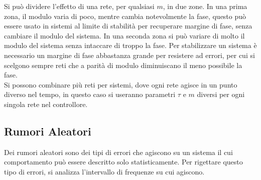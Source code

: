 \documentclass{article}
\numberwithin{equation}{subsection}
\begin{document}
Si può dividere l'effetto di una rete, per qualsiasi $m$, in due zone. In una prima zona, il modulo varia di poco, mentre cambia notevolmente la fase, questo può essere 
usato in sistemi al limite di stabilità per recuperare margine di fase, senza cambiare il modulo del sistema. In una seconda zona si può variare di molto il modulo del 
sistema senza intaccare di troppo la fase. Per stabilizzare un sistema è necessario un margine di fase abbastanza grande per resistere ad errori, per cui si scelgono sempre 
reti che a parità di modulo diminuiscano il meno possibile la fase. \\


Si possono combinare più reti per sistemi, dove ogni rete agisce in un punto diverso nel tempo, in questo caso si useranno parametri $\tau$ e $m$ diversi per ogni singola 
rete nel controllore. 






\subsection{Rumori Aleatori}

Dei rumori aleatori sono dei tipi di errori che agiscono su un sistema il cui comportamento può essere descritto solo 
statisticamente. Per rigettare questo tipo di errori, si analizza l'intervallo di frequenze su cui agiscono. 
\end{document}
